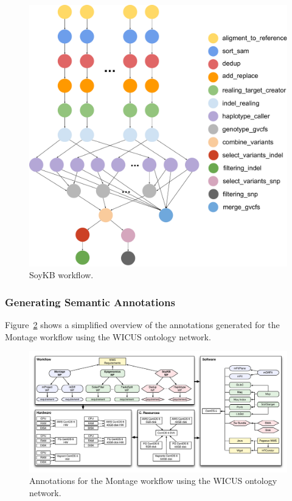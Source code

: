 \documentclass[final,5p,times,twocolumn]{elsarticle}
\begin{document}
\begin{figure}[!htb]
	\centering
	\includegraphics[width=0.95\linewidth]{figures/workflow-soybean}
	\caption{SoyKB workflow.}
	\label{fig:workflow-soykb}
\end{figure}


\subsubsection{Generating Semantic Annotations}
Figure~\ref{fig:annotations} shows a simplified overview of the annotations generated for the Montage workflow using the WICUS ontology network.

\begin{figure}[!htb]
	\centering
	\includegraphics[width=\linewidth]{figures/annotations}
	\caption{Annotations for the Montage workflow using the WICUS ontology network.}
	\label{fig:annotations}
\end{figure}
\end{document}
